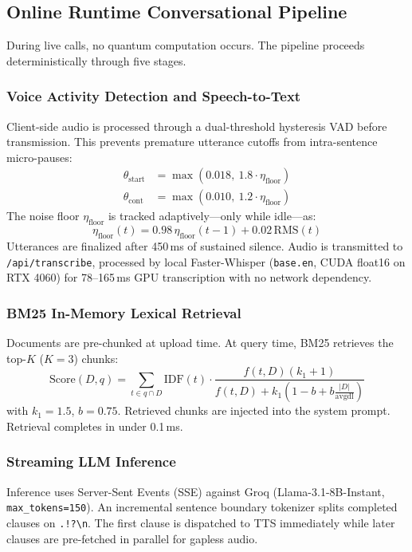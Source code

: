 \documentclass[conference]{IEEEtran}
\begin{document}
\subsection{Online Runtime Conversational Pipeline}

During live calls, no quantum computation occurs. The pipeline proceeds deterministically through five stages.

\subsubsection{Voice Activity Detection and Speech-to-Text}
Client-side audio is processed through a dual-threshold hysteresis VAD before transmission. This prevents premature utterance cutoffs from intra-sentence micro-pauses:
\begin{align}
\theta_{\text{start}} &= \max(0.018,\ 1.8 \cdot \eta_{\text{floor}}) \\
\theta_{\text{cont}}  &= \max(0.010,\ 1.2 \cdot \eta_{\text{floor}})
\end{align}
The noise floor $\eta_{\text{floor}}$ is tracked adaptively---only while idle---as:
\begin{equation}
\eta_{\text{floor}}(t) = 0.98\,\eta_{\text{floor}}(t{-}1) + 0.02\,\text{RMS}(t)
\end{equation}
Utterances are finalized after 450\,ms of sustained silence. Audio is transmitted to \texttt{/api/transcribe}, processed by local Faster-Whisper (\texttt{base.en}, CUDA float16 on RTX 4060) for 78--165\,ms GPU transcription with no network dependency.

\subsubsection{BM25 In-Memory Lexical Retrieval}
Documents are pre-chunked at upload time. At query time, BM25 retrieves the top-$K$ ($K=3$) chunks:
\begin{equation}
\text{Score}(D,q) = \sum_{t \in q \cap D} \text{IDF}(t) \cdot \frac{f(t,D)(k_1+1)}{f(t,D)+k_1\!\left(1-b+b\frac{|D|}{\text{avgdl}}\right)}
\end{equation}
with $k_1 = 1.5$, $b = 0.75$. Retrieved chunks are injected into the system prompt. Retrieval completes in under 0.1\,ms.

\subsubsection{Streaming LLM Inference}
Inference uses Server-Sent Events (SSE) against Groq (Llama-3.1-8B-Instant, \texttt{max\_tokens=150}). An incremental sentence boundary tokenizer splits completed clauses on \texttt{.!?\textbackslash n}. The first clause is dispatched to TTS immediately while later clauses are pre-fetched in parallel for gapless audio.
\end{document}
